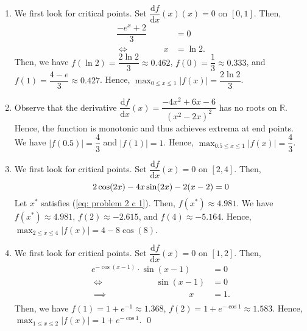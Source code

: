 \documentclass[11pt]{article}
\theoremstyle{break}
\newcommand{\dd}{\text{d}}
\numberwithin{equation}{theorem}
\begin{document}
\begin{enumerate}
    \item We first look for critical points. Set $\dfrac{\dd f}{\dd x}(x)(x)=0$ on $[0, 1]$. Then, \vspace{-0.6em}
    \begin{align*}
        \dfrac{-e^x+2}{3}&=0\\
        \iff \quad\quad\quad\quad x&=\ln2.
    \end{align*}
    Then, we have $f(\ln 2)=\dfrac{2\ln 2}{3}\approx0.462$, $f(0)=\dfrac{1}{3}\approx0.333$, and $f(1)=\dfrac{4-e}{3}\approx0.427$. Hence, $\displaystyle\max_{0\leq x\leq 1}|f(x)|=\dfrac{2\ln 2}{3}$.
    \item Observe that the derivative $\dfrac{\dd f}{\dd x}(x)=\dfrac{-4x^2+6x-6}{(x^2-2x)^2}$ has no roots on $\mathbb R$. Hence, the function is monotonic and thus achieves extrema at end points. We have $|f(0.5)|=\dfrac{4}{3}$ and $|f(1)|=1$. Hence, $\displaystyle\max_{0.5\leq x\leq 1}|f(x)|=\dfrac{4}{3}$.
    \item We first look for critical points. Set $\dfrac{\dd f}{\dd x}(x)=0$ on $[2, 4]$. Then, \vspace{-0.6em}
    \begin{equation}\label{eq: problem 2 c 1}
        2\cos(2x)-4x\sin(2x)-2(x-2)=0 \vspace{-0.6em}
    \end{equation}
    Let $x^\ast$ satisfies (\ref{eq: problem 2 c 1}). Then, $f(x^\ast)\approx4.981$. We have $f(x^\ast)\approx4.981$, $f(2)\approx-2.615$, and $f(4)\approx-5.164$. Hence, $\displaystyle\max_{2\leq x\leq 4}|f(x)|=4-8\cos(8)$.
    \item We first look for critical points. Set $\dfrac{\dd f}{\dd x}(x)=0$ on $[1, 2]$. Then, \vspace{-0.6em}
    \begin{align*}
        e^{-\cos(x-1)}\cdot\sin(x-1)&=0\\
        \iff\quad\quad\quad\quad\quad\quad\sin(x-1)&=0\\
        \implies\quad\quad\quad\quad\quad\quad\quad\quad\quad\ \  x&=1.\\[-3.4em]
    \end{align*}
    Then, we have $f(1)=1+e^{-1}\approx1.368$, $f(2)=1+e^{-\cos1}\approx1.583$. Hence, $\displaystyle\max_{1\leq x\leq 2}|f(x)|=1+e^{-\cos1}$. \qed
\end{enumerate}
\end{document}
